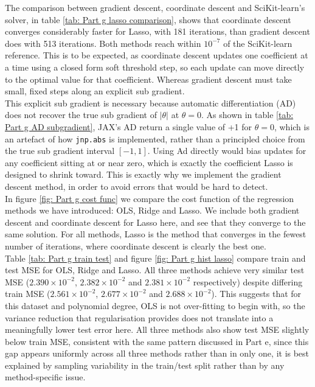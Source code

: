\documentclass[reprint,english,notitlepage]{revtex4-2}  %
\begin{document}
The comparison between gradient descent, coordinate descent and SciKit-learn's solver, in table \ref{tab: Part g lasso comparison}, shows that coordinate descent converges considerably faster for Lasso, with 181 iterations, than gradient descent does with 513 iterations. Both methods reach within $10^{-7}$ of the SciKit-learn reference. This is to be expected, as coordinate descent updates one coefficient at a time using a closed form soft threshold step, so each update can move directly to the optimal value for that coefficient. Whereas gradient descent must take small, fixed steps along an explicit sub gradient. \\
This explicit sub gradient is necessary because automatic differentiation (AD) does not recover the true sub gradient of $|\theta|$ at $\theta = 0$. As shown in table \ref{tab: Part g AD subgradient}, JAX's AD return a single value of +1 for $\theta = 0$, which is an artefact of how \texttt{jnp.abs} is implemented, rather than a principled choice from the true sub gradient interval $[-1, 1]$. Using Ad directly would bias updates for any coefficient sitting at or near zero, which is exactly the coefficient Lasso is designed to shrink toward. This is exactly why we implement the gradient descent method, in order to avoid errors that would be hard to detect. \\
In figure \ref{fig: Part g cost func} we compare the cost function of the regression methods we have introduced: OLS, Ridge and Lasso. We include both gradient descent and coordinate descent for Lasso here, and see that they converge to the same solution. For all methods, Lasso is the method that converges in the fewest number of iterations, where coordinate descent is clearly the best one. \\
Table \ref{tab: Part g train test} and figure \ref{fig: Part g hist lasso} compare train and test MSE for OLS, Ridge and Lasso. All three methods achieve very similar test MSE ($2.390\times10^{-2}$, $2.382\times10^{-2}$ and $2.381\times10^{-2}$ respectively) despite differing train MSE ($2.561\times10^{-2}$, $2.677\times10^{-2}$ and $2.688\times10^{-2}$). This suggests that for this dataset and polynomial degree, OLS is not over-fitting to begin with, so the variance reduction that regularisation provides does not translate into a meaningfully lower test error here. All three methods also show test MSE slightly below train MSE, consistent with the same pattern discussed in Part e, since this gap appears uniformly across all three methods rather than in only one, it is best explained by sampling variability in the train/test split rather than by any method-specific issue.\\
\end{document}
